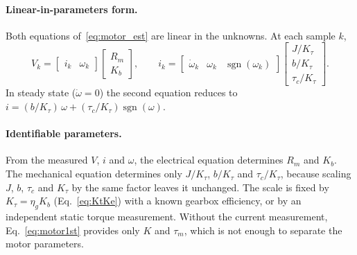 \documentclass[a4paper,11pt]{article}
\newcommand{\sgn}{\operatorname{sgn}}
\begin{document}
\paragraph{Linear-in-parameters form.} Both equations of~\eqref{eq:motor_est} are linear in the unknowns. At each sample $k$,
\begin{equation}
  V_k = \begin{bmatrix} i_k & \omega_k \end{bmatrix}
  \begin{bmatrix} R_m \\ K_b \end{bmatrix},
  \qquad
  i_k = \begin{bmatrix} \dot\omega_k & \omega_k & \sgn(\omega_k) \end{bmatrix}
  \begin{bmatrix} J/K_\tau \\ b/K_\tau \\ \tau_c/K_\tau \end{bmatrix}.
  \label{eq:motor_reg}
\end{equation}
In steady state ($\dot\omega = 0$) the second equation reduces to $i = (b/K_\tau)\,\omega + (\tau_c/K_\tau)\sgn(\omega)$.

\paragraph{Identifiable parameters.} From the measured $V$, $i$ and $\omega$, the electrical equation determines $R_m$ and $K_b$. The mechanical equation determines only $J/K_\tau$, $b/K_\tau$ and $\tau_c/K_\tau$, because scaling $J$, $b$, $\tau_c$ and $K_\tau$ by the same factor leaves it unchanged. The scale is fixed by $K_\tau = \eta_g K_b$ (Eq.~\eqref{eq:KtKe}) with a known gearbox efficiency, or by an independent static torque measurement. Without the current measurement, Eq.~\eqref{eq:motor1st} provides only $K$ and $\tau_m$, which is not enough to separate the motor parameters.
\end{document}
